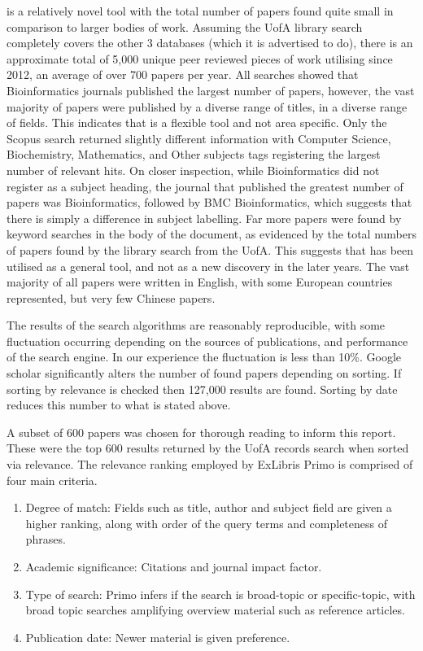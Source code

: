  is a relatively novel tool with the total number of papers found quite small in comparison to larger bodies of work. Assuming the UofA library search completely covers the other 3 databases (which it is advertised to do), there is an approximate total of 5,000 unique peer reviewed pieces of work utilising  since 2012, an average of over 700 papers per year.  All searches showed that Bioinformatics journals published the largest number of  papers, however, the vast majority of papers were published by a diverse range of titles, in a diverse range of fields. This indicates that  is a flexible tool and not area specific. Only the Scopus search returned slightly different information with Computer Science, Biochemistry, Mathematics, and Other subjects tags registering the largest number of relevant hits. On closer inspection, while Bioinformatics did not register as a subject heading, the journal that published the greatest number of papers was Bioinformatics, followed by BMC Bioinformatics, which suggests that there is simply a difference in subject labelling. Far more papers were found by keyword searches in the body of the document, as evidenced by the total numbers of papers found by the library search from the UofA. This suggests that  has been utilised as a general tool, and not as a new discovery in the later years. The vast majority of all papers were written in English, with some European countries represented, but very few Chinese papers.
	
The results of the search algorithms are reasonably reproducible, with some fluctuation occurring depending on the sources of publications, and performance of the search engine. In our experience the fluctuation is less than 10\%.  Google scholar significantly alters the number of found papers depending on sorting. If sorting by relevance is checked then 127,000 results are found. Sorting by date reduces this number to what is stated above.

A subset of 600 papers was chosen for thorough reading to inform this report. These were the top 600 results returned by the UofA records search when sorted via relevance. The relevance ranking employed by ExLibris Primo is comprised of four main criteria.
\begin{enumerate}
	\item Degree of match: Fields such as title, author and subject field are given a higher ranking, along with order of the query terms and completeness of phrases.
	\item Academic significance: Citations and journal impact factor.
	\item Type of search: Primo infers if the search is broad-topic or specific-topic, with broad topic searches amplifying overview material such as reference articles.
	\item Publication date: Newer material is given preference.
\end{enumerate}

